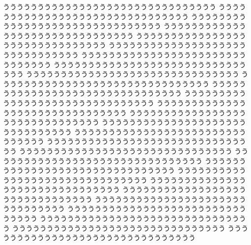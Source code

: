 \begin{breakRline}[fboxsep=10pt]
ううううううううううううううううううううううううううううううう
ううううううううううううううううううううううううううううううう
ううううううううううううううううううううううううううううううう
ううううううううううううううううううううううううううううううう
ううううううううううううううううううううううううううううううう
ううううううううううううううううううううううううううううううう
ううううううううううううううううううううううううううううううう
ううううううううううううううううううううううううううううううう
ううううううううううううううううううううううううううううううう
ううううううううううううううううううううううううううううううう
ううううううううううううううううううううううううううううううう
ううううううううううううううううううううううううううううううう
ううううううううううううううううううううううううううううううう
ううううううううううううううううううううううううううううううう
ううううううううううううううううううううううううううううううう
ううううううううううううううううううううううううううううううう
ううううううううううううううううううううううううううううううう
ううううううううううううううううううううううううううううううう
ううううううううううううううううううううううううううううううう
ううううううううううううううううううううううううううううううう
ううううううううううううううううううううううううううううううう
ううううううううううううううううううううううううううううううう
ううううううううううううううううううううううううううううううう
ううううううううううううううううううううううううううううううう
ううううううううううううううううううううううううううううううう
ううううううううううううううううううううううううううううううう
ううううううううううううううううううううううううううううううう
ううううううううううううううううううううううううううううううう
\end{breakRline}
